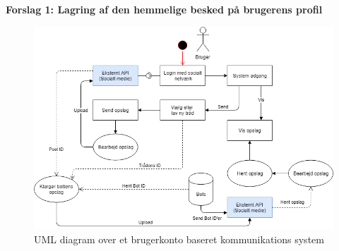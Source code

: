 



\textbf{Forslag 1: Lagring af den hemmelige besked på brugerens profil}
\begin{figure}[H]
    \centering
    \includegraphics[width=0.8\linewidth]{Projectdoc/Assets/Illustrationer/userbased-system.png}
    \caption{UML diagram over et brugerkonto baseret kommunikations system}
    \label{fig:userbased}
\end{figure}

